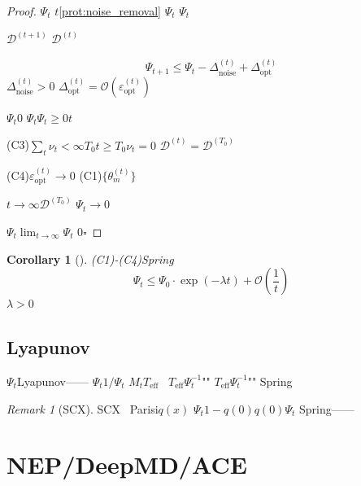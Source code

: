 \documentclass[12pt,a4paper]{article}
\newtheorem{corollary}[theorem]{Corollary}
\theoremstyle{remark}
\newtheorem{remark}[theorem]{Remark}
\newcommand{\D}{\mathcal{D}}
\newcommand{\Lyap}{\ensuremath{\Psi}}
\begin{document}
\begin{proof}


\textbf{}$\Lyap_t$
$t$\ref{prot:noise_removal}
$\Lyap_t$
$\Lyap_t$

$\D^{(t+1)}$
$\D^{(t)}$

\begin{equation}\label{eq:lyap_decrease}
    \Lyap_{t+1} \leq \Lyap_t - \Delta_{\text{noise}}^{(t)} + \Delta_{\text{opt}}^{(t)}
\end{equation}
$\Delta_{\text{noise}}^{(t)} > 0$
$\Delta_{\text{opt}}^{(t)} = \mathcal{O}(\varepsilon_{\text{opt}}^{(t)})$

\textbf{}$\Lyap_t$0
$\Lyap_t$$\Lyap_t \geq 0$$t$

\textbf{}
(C3)$\sum_t \nu_t < \infty$$T_0$$t \geq T_0$$\nu_t = 0$
$\D^{(t)} = \D^{(T_0)}$

(C4)$\varepsilon_{\text{opt}}^{(t)} \to 0$
(C1)$\{\theta_m^{(t)}\}$


$t \to \infty$$\D^{(T_0)}$
$\Lyap_t \to 0$

$\Lyap_t$$\lim_{t\to\infty} \Lyap_t$
0\hfill $\square$
\end{proof}

\begin{corollary}[]\label{cor:convergence_rate}
(C1)-(C4)Spring
\begin{equation}\label{eq:convergence_rate}
    \Lyap_t \leq \Lyap_0 \cdot \exp(-\lambda t) + \mathcal{O}\left(\frac{1}{t}\right)
\end{equation}
$\lambda > 0$
\end{corollary}

\subsection{Lyapunov}

$\Lyap_t$Lyapunov——
$\Lyap_t$$1/\Lyap_t$
$M_t$$T_{\text{eff}}$~\cite{scx_hamiltonian}
$T_{\text{eff}}$$\Lyap_t^{-1}$""
$T_{\text{eff}}$$\Lyap_t^{-1}$""
Spring\textit{}

\begin{remark}[SCX]
SCX~\cite{scx_hamiltonian}
Parisi$q(x)$
$\Lyap_t$$1 - q(0)$$q(0)$$\Lyap_t$
Spring——

\end{remark}

\newpage

\section{NEP/DeepMD/ACE}
\end{document}
